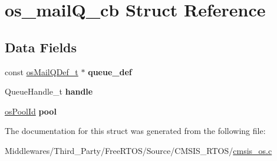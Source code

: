 \hypertarget{structos__mail_q__cb}{}\section{os\+\_\+mail\+Q\+\_\+cb Struct Reference}
\label{structos__mail_q__cb}
\subsection*{Data Fields}
\begin{DoxyCompactItemize}
\item 
\mbox{\label{structos__mail_q__cb_adf868564b2cea6556ed4f6464cdaeca6}} 
const \mbox{\hyperlink{cmsis__os_8h_a4478aff059e4a47e87e2f8d62f0f04c8}{os\+Mail\+Q\+Def\+\_\+t}} $\ast$ {\bfseries queue\+\_\+def}
\item 
\mbox{\label{structos__mail_q__cb_a074de1a7df4efeda9aa66280436408be}} 
Queue\+Handle\+\_\+t {\bfseries handle}
\item 
\mbox{\label{structos__mail_q__cb_a613844e7281d5fa7d2df2054ad553e64}} 
\mbox{\hyperlink{cmsis__os_8h_a08d2e20fd9bbd96220fe068d420f3686}{os\+Pool\+Id}} {\bfseries pool}
\end{DoxyCompactItemize}


The documentation for this struct was generated from the following file\+:\begin{DoxyCompactItemize}
\item 
Middlewares/\+Third\+\_\+\+Party/\+Free\+R\+T\+O\+S/\+Source/\+C\+M\+S\+I\+S\+\_\+\+R\+T\+O\+S/\mbox{\hyperlink{cmsis__os_8c}{cmsis\+\_\+os.\+c}}\end{DoxyCompactItemize}
